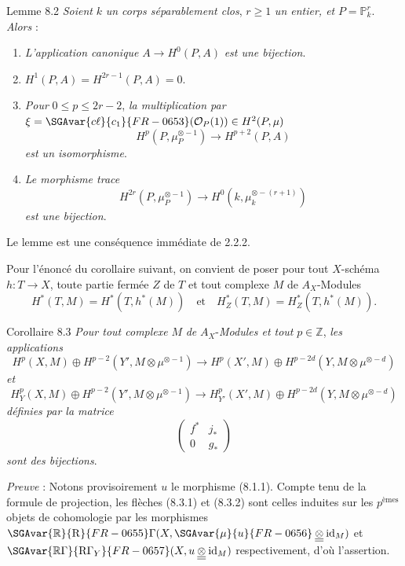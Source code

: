 \begin{statement}{Lemme 8.2}
\emph{Soient} $k$ \emph{un corps séparablement clos}, $r\ge1$ \emph{un entier, et} $P=\mathbb{P}_k^r$. \emph{Alors} :
\begin{enumerate}[label=\alph*)]
\item \emph{L'application canonique} $A\to H^0(P,A)$ \emph{est une bijection}.
\item $H^1(P,A)=H^{2r-1}(P,A)=0$.
\item
\emph{Pour} $0\le p\le2r-2$, \emph{la multiplication par} $\xi=\SGAvar{c\ell}{c_1}{FR-0653}(\mathcal{O}_P(1))\in H^2(P,\mu)$
\[
H^p(P,\mu_P^{\otimes -1})\to H^{p+2}(P,A)
\]
\emph{est un isomorphisme}.
\item \emph{Le morphisme trace}
\[
H^{2r}(P,\mu_P^{\otimes -1})\to H^0(k,\mu_k^{\otimes -(r+1)})
\]
\emph{est une bijection}.
\end{enumerate}
\end{statement}

Le lemme est une conséquence immédiate de 2.2.2.

Pour l'énoncé du corollaire suivant, on convient de poser pour tout $X$-schéma $h:T\to X$, toute partie fermée $Z$ de $T$ et tout complexe $M$ de $A_X$-Modules
\[
H^*(T,M)=H^*(T,h^*(M))
\quad\text{et}\quad
H^*_Z(T,M)=H^*_Z(T,h^*(M)).
\]

\begin{statement}{Corollaire 8.3}
\emph{Pour tout complexe} $M$ \emph{de} $A_X$-\emph{Modules et tout} $p\in\mathbb{Z}$, \emph{les applications}
\[
H^p(X,M)\oplus H^{p-2}(Y',M\otimes\mu^{\otimes -1})
\to
H^p(X',M)\oplus H^{p-2d}(Y,M\otimes\mu^{\otimes -d})
\tag{8.3.1.}
\]
\emph{et}
\[
H_Y^p(X,M)\oplus H^{p-2}(Y',M\otimes\mu^{\otimes -1})
\to
H_{Y'}^p(X',M)\oplus H^{p-2d}(Y,M\otimes\mu^{\otimes -d})
\tag{8.3.2}
\]
\emph{définies par la matrice}
\[
\begin{pmatrix}
f^*&j_*\\
0&g_*
\end{pmatrix}
\]
\emph{sont des bijections}.
\end{statement}

\emph{Preuve} : Notons provisoirement $u$ le morphisme (8.1.1). Compte tenu de la formule de projection, les flèches (8.3.1) et (8.3.2) sont celles induites sur les $p^{\text{èmes}}$ objets de cohomologie par les morphismes $\SGAvar{\mathbb{R}}{\mathrm{R}}{FR-0655}\Gamma(X,\SGAvar{\mu}{u}{FR-0656}\mathbin{\underline{\underline{\otimes}}}\operatorname{id}_M)$ et $\SGAvar{\mathbb{R}\Gamma}{\mathrm{R}\Gamma_Y}{FR-0657}(X,u\mathbin{\underline{\underline{\otimes}}}\operatorname{id}_M)$ respectivement, d'où l'assertion.

